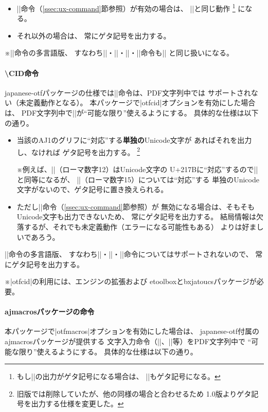 \documentclass[uplatex,dvipdfmx,a4paper]{jsarticle}
\newcommand{\Pkg}[1]{\textsf{#1}}
\newcommand{\Note}{\par\noindent ※}
\begin{document}
\begin{itemize}
\item |\Ux|命令（\ref{ssec:ux-command}節参照）が有効の場合は、
  |\Ux|と同じ動作
  \footnote{もし|\Ux|の出力がゲタ記号になる場合は、
    |\UTF|もゲタ記号になる。}%
  になる。
\item それ以外の場合は、
  常にゲタ記号を出力する。
\end{itemize}

\Note |\UTF|命令の多言語版、
すなわち|\UTFC|・|\UTFK|・|\UTFM|・|\UTFT|命令も|\UTF|%
と同じ扱いになる。

\paragraph{\textbackslash CID命令}
\Pkg{japanese-otf}パッケージの仕様では|\CID|命令は、PDF文字列中では
サポートされない（未定義動作となる）。
本パッケージで|otfcid|オプションを有効にした場合は、
PDF文字列中で|\CID|が“可能な限り”使えるようにする。
具体的な仕様は以下の通り。

\begin{itemize}
\item 当該のAJ1のグリフに“対応”する\textbf{単独の}Unicode文字が
  あればそれを出力し、なければ
  ゲタ記号を出力する。
  \footnote{旧版では削除していたが、他の同様の場合と合わせるため
    1.0版よりゲタ記号を出力する仕様を変更した。}
  \Note 例えば、||（ローマ数字12）はUnicode文字の
  U+217Bに“対応”するので||と同等になるが、
  ||（ローマ数字15）については“対応”する
  単独のUnicode文字がないので、ゲタ記号に置き換えられる。
\item ただし|\Ux|命令（\ref{ssec:ux-command}節参照）が
  無効になる場合は、そもそもUnicode文字も出力できないため、
  常にゲタ記号を出力する。
  結局情報は欠落するが、それでも未定義動作（エラーになる可能性もある）
  よりは好ましいであろう。
\end{itemize}

|\CID|命令の多言語版、
すなわち|\CIDC|・|\CIDK|・|\CIDT|命令についてはサポートされないので、
常にゲタ記号を出力する。

\Note |otfcid|の利用には、エンジンの{\eTeX}拡張および
\Pkg{etoolbox}と\Pkg{bxjatoucs}パッケージが必要。

\paragraph{ajmacrosパッケージの命令}
本パッケージで|otfmacros|オプションを有効にした場合は、
\Pkg{japanese-otf}付属の\Pkg{ajmacros}パッケージが提供する
文字入力命令（|\ajMaru|、|\ajLig|等）をPDF文字列中で
“可能な限り”使えるようにする。
具体的な仕様は以下の通り。
\end{document}

